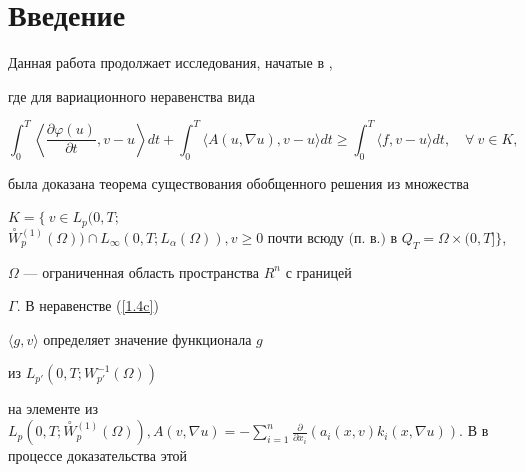 \maketitle





\section{Введение}


\par Данная работа продолжает исследования, начатые в \cite{N},


где для вариационного неравенства вида


\begin{equation}\label{1.4c}


\int^{T}_{0} \left\langle \frac{\partial\varphi (u)}{\partial t} ,


v - u \right\rangle dt +


\int^{T}_{0} \langle A( u,\nabla u), v - u \rangle dt \ge


\int^{T}_{0} \langle f , v - u \rangle dt, \quad \forall \ v \in K, 


\end{equation}


была доказана теорема существования обобщенного решения из множества


$ K = \{ \  v \in L_{p}( 0,T;$ $\overset\circ W{}^{(1)}_{p}(\Omega)) \cap




L_{\infty }( 0,T; L_{\alpha }(\Omega ) ),


v \ge 0 \text { почти всюду (п.~в.) в }


Q_{T} = \Omega \times (0,T]\} $,


$\Omega $ --- ограниченная область пространства $R^{n}$ с границей


$\Gamma $. В неравенстве (\ref{1.4c})


$\langle g , v \rangle $ определяет значение функционала $g$


из $L_{p'} (0,T;W^{-1}_{p'} ( \Omega ))$


на элементе из $L_{p} ( 0,T;


\overset\circ W{}^{(1)}_{p}(\Omega ) ),


A( v , \nabla u ) = - \sum\limits_{i=1}^{n} \frac{\partial}{\partial x_i}


( a_i (x,v) k_i (x,\nabla u) )$. В \cite{N} в процессе доказательства этой


